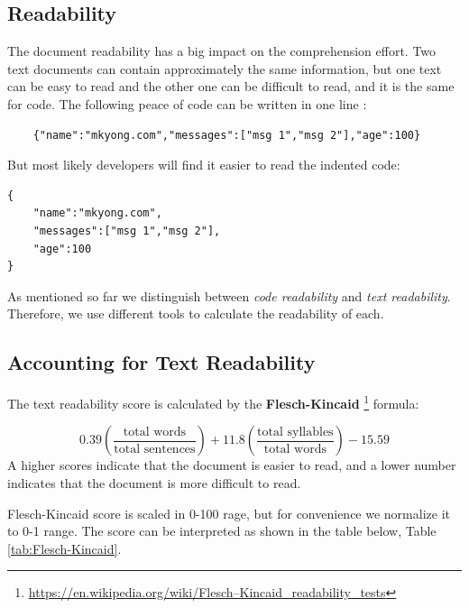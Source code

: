 \documentclass[12pt,mscthesis]{usiinfthesis}
\begin{document}
	\subsection{Readability} 
		The document readability has a big impact on the comprehension effort. Two text documents can contain approximately the same information, but one text can be easy to read and the other one can be difficult to read, and it is the same for code. The following peace of code can be written in one line :

		\begin{lstlisting}
	{"name":"mkyong.com","messages":["msg 1","msg 2"],"age":100}

		\end{lstlisting}	
	But most likely developers will find it easier to read the indented code:\\

	 	\begin{lstlisting}
{
	"name":"mkyong.com",
	"messages":["msg 1","msg 2"],
	"age":100
}
	\end{lstlisting}
 
	As mentioned so far we distinguish between \emph{code readability} and \emph{text readability}. Therefore, we use different tools to calculate the readability of each. 

\subsection{Accounting for Text Readability}
	The text readability score is calculated by the \textbf{Flesch-Kincaid} \footnote{\url{https://en.wikipedia.org/wiki/Flesch–Kincaid_readability_tests}} formula:
	

	\[0.39\left({\frac  {{\mbox{total words}}}{{\mbox{total sentences}}}}\right)+11.8\left({\frac  {{\mbox{total syllables}}}{{\mbox{total words}}}}\right)-15.59\]
	A higher scores indicate that the document is easier to read, and a lower number indicates that the document is more difficult to read.


	Flesch-Kincaid score is scaled in 0-100 rage, but for convenience we normalize it to 0-1 range. The score can be interpreted as shown in the table below, Table \ref{tab:Flesch-Kincaid}.
	
\end{document}

